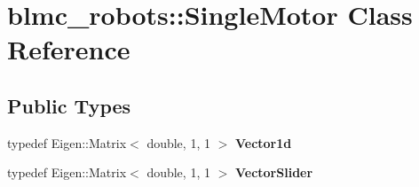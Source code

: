 \hypertarget{classblmc__robots_1_1SingleMotor}{}\section{blmc\+\_\+robots\+:\+:Single\+Motor Class Reference}
\label{classblmc__robots_1_1SingleMotor}
\subsection*{Public Types}
\begin{DoxyCompactItemize}
\item 
typedef Eigen\+::\+Matrix$<$ double, 1, 1 $>$ {\bfseries Vector1d}\hypertarget{classblmc__robots_1_1SingleMotor_ac383dc0615dcb6b6fb1470b517561c63}{}\label{classblmc__robots_1_1SingleMotor_ac383dc0615dcb6b6fb1470b517561c63}

\item 
typedef Eigen\+::\+Matrix$<$ double, 1, 1 $>$ {\bfseries Vector\+Slider}\hypertarget{classblmc__robots_1_1SingleMotor_a586b21d344037450dca9b11c8a6882b9}{}\label{classblmc__robots_1_1SingleMotor_a586b21d344037450dca9b11c8a6882b9}

\end{DoxyCompactItemize}
